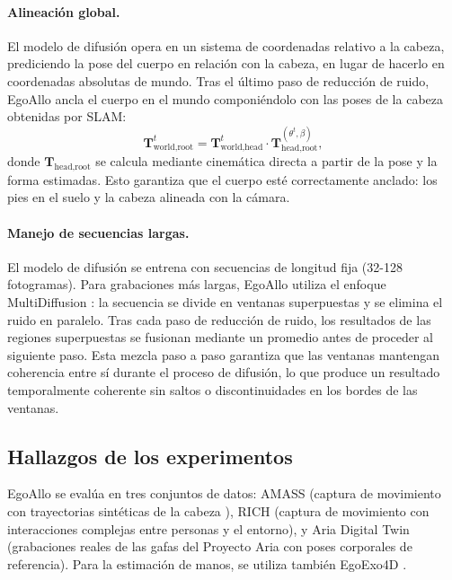\documentclass[../../book-main_es.tex]{subfiles}
\begin{document}
\paragraph{Alineación global.}
El modelo de difusión opera en un sistema de coordenadas relativo a la cabeza,
prediciendo la pose del cuerpo en relación con la cabeza, en lugar de hacerlo en coordenadas absolutas
de mundo. Tras el último paso de reducción de ruido, EgoAllo ancla el
cuerpo en el mundo componiéndolo con las poses de la cabeza obtenidas por SLAM:
\begin{equation}
    \boldsymbol{T}_{\text{world},\text{root}}^t
    =
    \boldsymbol{T}_{\text{world},\text{head}}^t
    \cdot
    \boldsymbol{T}_{\text{head},\text{root}}^{(\theta^t, \beta)},
\end{equation}
donde $\boldsymbol{T}_{\text{head},\text{root}}$ se calcula mediante cinemática directa
a partir de la pose y la forma estimadas. Esto garantiza que el cuerpo
esté correctamente anclado: los pies en el suelo y la cabeza alineada con la cámara.

\paragraph{Manejo de secuencias largas.}
El modelo de difusión se entrena con secuencias de longitud fija (32-128 fotogramas). 
Para grabaciones más largas, EgoAllo utiliza el enfoque MultiDiffusion
\citep{bar2023multidiffusion}: la secuencia se divide en
ventanas superpuestas y se elimina el ruido en paralelo. Tras cada paso de reducción de ruido,
los resultados de las regiones superpuestas se fusionan mediante un promedio
antes de proceder al siguiente paso. Esta mezcla paso a paso garantiza
que las ventanas mantengan coherencia entre sí durante el
proceso de difusión, lo que produce un resultado temporalmente coherente sin
saltos o discontinuidades en los bordes de las ventanas.

\subsection{Hallazgos de los experimentos}
\label{sub:egoallo_experiments}

EgoAllo se evalúa en tres conjuntos de datos: AMASS
\citep{mahmood2019amass} (captura de movimiento con trayectorias sintéticas de la cabeza
), RICH \citep{huang2022rich} (captura de movimiento con
interacciones complejas entre personas y el entorno), y Aria Digital Twin
\citep{pan2023aria} (grabaciones reales de las gafas del Proyecto Aria con
poses corporales de referencia). Para la estimación de manos, se utiliza también EgoExo4D
\citep{grauman2023egoexo4d}.
\end{document}
